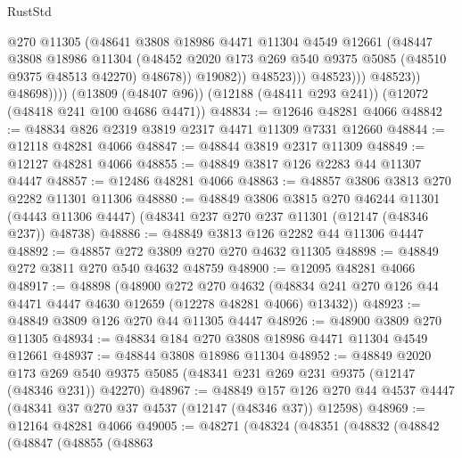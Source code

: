 \begin{lexlean}{RustStd}
\begin{coremodule}
                              @270
                              @11305
                              (@48641
                                @3808
                                @18986
                                @4471
                                @11304
                                @4549
                                @12661
                                (@48447
                                  @3808
                                  @18986
                                  @11304
                                  (@48452
                                    @2020
                                    @173
                                    @269
                                    @540
                                    @9375
                                    @5085
                                    (@48510 @9375 @48513 @42270)
                                    @48678))
                                @19082))
                            @48523)))
                      @48523)))
                @48523))
            @48698))))
    (@13809 (@48407 @96))
    (@12188 (@48411 @293 @241))
    (@12072 (@48418 @241 @100 @4686 @4471))
@48834 := @12646 @48281 @4066
@48842 := @48834 @826 @2319 @3819 @2317 @4471 @11309 @7331 @12660
@48844 := @12118 @48281 @4066
@48847 := @48844 @3819 @2317 @11309
@48849 := @12127 @48281 @4066
@48855 := @48849 @3817 @126 @2283 @44 @11307 @4447
@48857 := @12486 @48281 @4066
@48863 := @48857 @3806 @3813 @270 @2282 @11301 @11306
@48880 := @48849
    @3806
    @3815
    @270
    @46244
    @11301
    (@4443 @11306 @4447)
    (@48341 @237 @270 @237 @11301 (@12147 (@48346 @237)) @48738)
@48886 := @48849 @3813 @126 @2282 @44 @11306 @4447
@48892 := @48857 @272 @3809 @270 @270 @4632 @11305
@48898 := @48849 @272 @3811 @270 @540 @4632 @48759
@48900 := @12095 @48281 @4066
@48917 := @48898
    (@48900
      @272
      @270
      @4632
      (@48834 @241 @270 @126 @44 @4471 @4447 @4630 @12659 (@12278 @48281 @4066) @13432))
@48923 := @48849 @3809 @126 @270 @44 @11305 @4447
@48926 := @48900 @3809 @270 @11305
@48934 := @48834 @184 @270 @3808 @18986 @4471 @11304 @4549 @12661
@48937 := @48844 @3808 @18986 @11304
@48952 := @48849
    @2020
    @173
    @269
    @540
    @9375
    @5085
    (@48341 @231 @269 @231 @9375 (@12147 (@48346 @231)) @42270)
@48967 := @48849
    @157
    @126
    @270
    @44
    @4537
    @4447
    (@48341 @37 @270 @37 @4537 (@12147 (@48346 @37)) @12598)
@48969 := @12164 @48281 @4066
@49005 := @48271
    (@48324
      (@48351
        (@48832
          (@48842
            (@48847
              (@48855
                (@48863

\end{coremodule}
\end{lexlean}
